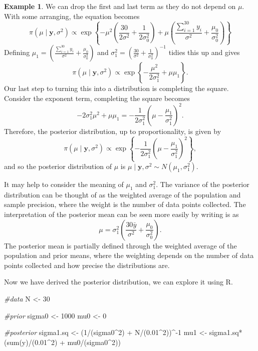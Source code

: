 \documentclass[
]{book}
\newenvironment{Shaded}{\begin{snugshade}}{\end{snugshade}}
\newcommand{\CommentTok}[1]{\textcolor[rgb]{0.56,0.35,0.01}{\textit{#1}}}
\newcommand{\DecValTok}[1]{\textcolor[rgb]{0.00,0.00,0.81}{#1}}
\newcommand{\FloatTok}[1]{\textcolor[rgb]{0.00,0.00,0.81}{#1}}
\newcommand{\FunctionTok}[1]{\textcolor[rgb]{0.00,0.00,0.00}{#1}}
\newcommand{\NormalTok}[1]{#1}
\newcommand{\OtherTok}[1]{\textcolor[rgb]{0.56,0.35,0.01}{#1}}
\newcommand{\SpecialCharTok}[1]{\textcolor[rgb]{0.00,0.00,0.00}{#1}}
\theoremstyle{definition}
\theoremstyle{definition}
\newtheorem{example}{Example}[chapter]
\theoremstyle{definition}
\theoremstyle{definition}
\theoremstyle{remark}
\begin{document}
\begin{example}
We can drop the first and last term as they do not depend on \(\mu\). With some arranging, the equation becomes
\[
\pi(\mu \mid \boldsymbol{y}, \sigma^2) \propto \exp\left\{-\mu^2\left(\frac{30}{2\sigma^2}  + \frac{1}{2\sigma_0^2}\right) + \mu\left(\frac{\sum_{i=1}^{30}y_i}{\sigma^2} + \frac{\mu_0}{\sigma_0^2} \right)  \right\}
\]
Defining \(\mu_1 =\left(\frac{\sum_{i=1}^{30}y_i}{\sigma^2} + \frac{\mu_0}{\sigma_0^2} \right)\) and \(\sigma^2_1 = \left(\frac{30}{\sigma^2} + \frac{1}{\sigma_0^2}\right)^{-1}\) tidies this up and gives
\[
\pi(\mu \mid \boldsymbol{y}, \sigma^2) \propto \exp\left\{-\frac{\mu^2}{2\sigma_1^2} + \mu\mu_1 \right\}.
\]
Our last step to turning this into a distribution is completing the square. Consider the exponent term, completing the square becomes
\[
-2\sigma_1^2\mu^2 + \mu\mu_1 = -\frac{1}{2\sigma^2_1}\left(\mu - \frac{\mu_1}{\sigma_1^2} \right)^2.
\]
Therefore, the posterior distribution, up to proportionality, is given by
\[
\pi(\mu \mid \boldsymbol{y}, \sigma^2) \propto \exp\left\{-\frac{1}{2\sigma^2_1}\left(\mu - \frac{\mu_1}{\sigma_1^2} \right)^2\right\},
\]
and so the posterior distribution of \(\mu\) is \(\mu \mid \boldsymbol{y}, \sigma^2 \sim N(\mu_1, \sigma^2_1)\).

It may help to consider the meaning of \(\mu_1\) and \(\sigma^2_1\). The variance of the posterior distribution can be thought of as the weighted average of the population and sample precision, where the weight is the number of data points collected. The interpretation of the posterior mean can be seen more easily by writing is as
\[
\mu  = \sigma_1^2\left(\frac{30\bar{y}}{\sigma^2} + \frac{\mu_0}{\sigma_0^2} \right).
\]
The posterior mean is partially defined through the weighted average of the population and prior means, where the weighting depends on the number of data points collected and how precise the distributions are.

Now we have derived the posterior distribution, we can explore it using R.

\begin{Shaded}
\begin{Highlighting}[]
\CommentTok{\#data}
\NormalTok{N }\OtherTok{\textless{}{-}} \DecValTok{30}

\CommentTok{\#prior}
\NormalTok{sigma0 }\OtherTok{\textless{}{-}} \DecValTok{1000}
\NormalTok{mu0     }\OtherTok{\textless{}{-}} \DecValTok{0}

\CommentTok{\#posterior}
\NormalTok{sigma1.sq }\OtherTok{\textless{}{-}}\NormalTok{ (}\DecValTok{1}\SpecialCharTok{/}\NormalTok{(sigma0}\SpecialCharTok{\^{}}\DecValTok{2}\NormalTok{)  }\SpecialCharTok{+}\NormalTok{ N}\SpecialCharTok{/}\NormalTok{(}\FloatTok{0.01}\SpecialCharTok{\^{}}\DecValTok{2}\NormalTok{))}\SpecialCharTok{\^{}{-}}\DecValTok{1}
\NormalTok{mu1       }\OtherTok{\textless{}{-}}\NormalTok{ sigma1.sq}\SpecialCharTok{*}\NormalTok{(}\FunctionTok{sum}\NormalTok{(y)}\SpecialCharTok{/}\NormalTok{(}\FloatTok{0.01}\SpecialCharTok{\^{}}\DecValTok{2}\NormalTok{) }\SpecialCharTok{+}\NormalTok{ mu0}\SpecialCharTok{/}\NormalTok{(sigma0}\SpecialCharTok{\^{}}\DecValTok{2}\NormalTok{))}


\end{Highlighting}
\end{Shaded}
\end{example}
\end{document}
